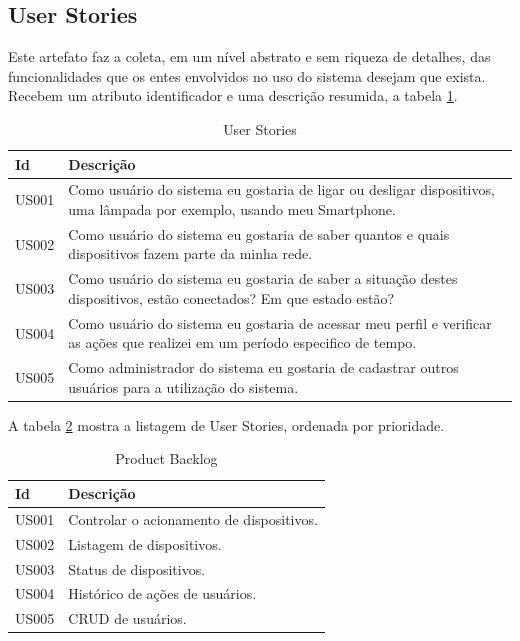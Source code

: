 \subsection{User Stories}
Este artefato faz a coleta, em um nível abstrato e sem riqueza de detalhes, das funcionalidades que os entes envolvidos no uso do sistema desejam que exista. Recebem um atributo identificador e uma descrição resumida, a tabela \ref{user-stories}.

\begin{table}[H]
   \caption{User Stories}
   \label{user-stories}
{
   \begin{tabularx}{\linewidth}{lX}
   \toprule
   Id & Descrição \\
   \midrule \midrule
   
    US001 & Como usuário do sistema eu gostaria de ligar ou desligar dispositivos, uma lâmpada por exemplo, usando meu Smartphone. \\

    US002 & Como usuário do sistema eu gostaria de saber quantos e quais dispositivos fazem parte da minha rede. \\

    US003 & Como usuário do sistema eu gostaria de saber a situação destes dispositivos, estão conectados? Em que estado estão? \\

    US004 & Como usuário do sistema eu gostaria de acessar meu perfil e verificar as ações que realizei em um período especifico de tempo. \\

    US005 & Como administrador do sistema eu gostaria de cadastrar outros usuários para a utilização do sistema. \\
   
   \bottomrule
   \end{tabularx}
}{
}
\end{table}

A tabela \ref{product} mostra a listagem de User Stories, ordenada por prioridade.

\begin{table}[H]
   \caption{Product Backlog}
   \label{product}
{
   \begin{tabular}{ll}
   \toprule
   Id & Descrição \\
   \midrule \midrule
   
    US001 & Controlar o acionamento de dispositivos. \\
    US002 & Listagem de dispositivos. \\
    US003 & Status de dispositivos. \\
    US004 & Histórico de ações de usuários. \\
    US005 & CRUD de usuários. \\
   \bottomrule
   \end{tabular}
}{
}
\end{table}

